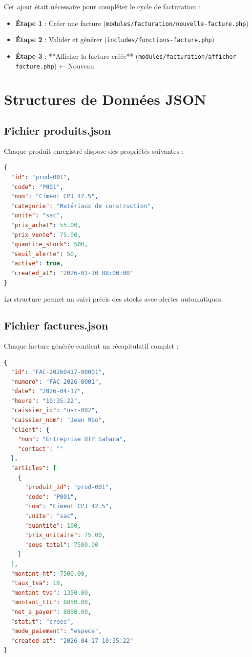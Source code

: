 \documentclass[12pt,a4paper]{report}
\begin{document}
Cet ajout était nécessaire pour compléter le cycle de facturation :
\begin{itemize}
    \item \textbf{Étape 1} : Créer une facture (\texttt{modules/facturation/nouvelle-facture.php})
    \item \textbf{Étape 2} : Valider et générer (\texttt{includes/fonctions-facture.php})
    \item \textbf{Étape 3} : **Afficher la facture créée** (\texttt{modules/facturation/afficher-facture.php}) ← Nouveau
\end{itemize}

\section{Structures de Données JSON}

\subsection{Fichier produits.json}

Chaque produit enregistré dispose des propriétés suivantes :

\begin{lstlisting}[language=json]
{
  "id": "prod-001",
  "code": "P001",
  "nom": "Ciment CPJ 42.5",
  "categorie": "Matériaux de construction",
  "unite": "sac",
  "prix_achat": 55.00,
  "prix_vente": 75.00,
  "quantite_stock": 500,
  "seuil_alerte": 50,
  "active": true,
  "created_at": "2026-01-10 08:00:00"
}
\end{lstlisting}

La structure permet un suivi précis des stocks avec alertes automatiques.

\subsection{Fichier factures.json}

Chaque facture générée contient un récapitulatif complet :

\begin{lstlisting}[language=json]
{
  "id": "FAC-20260417-00001",
  "numero": "FAC-2026-0001",
  "date": "2026-04-17",
  "heure": "10:35:22",
  "caissier_id": "usr-002",
  "caissier_nom": "Jean Mbo",
  "client": {
    "nom": "Entreprise BTP Sahara",
    "contact": ""
  },
  "articles": [
    {
      "produit_id": "prod-001",
      "code": "P001",
      "nom": "Ciment CPJ 42.5",
      "unite": "sac",
      "quantite": 100,
      "prix_unitaire": 75.00,
      "sous_total": 7500.00
    }
  ],
  "montant_ht": 7500.00,
  "taux_tva": 18,
  "montant_tva": 1350.00,
  "montant_ttc": 8850.00,
  "net_a_payer": 8850.00,
  "statut": "creee",
  "mode_paiement": "espece",
  "created_at": "2026-04-17 10:35:22"
}
\end{lstlisting}
\end{document}
